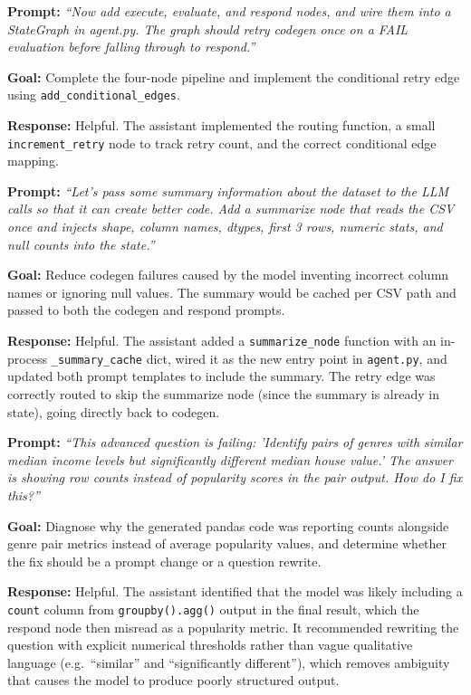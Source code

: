 \documentclass[12pt, oneside]{report}
\begin{document}

\textbf{Prompt:} \textit{``Now add execute, evaluate, and respond nodes, and wire them into a StateGraph in agent.py. The graph should retry codegen once on a FAIL evaluation before falling through to respond.''}

\textbf{Goal:} Complete the four-node pipeline and implement the conditional retry edge using \texttt{add\_conditional\_edges}.

\textbf{Response:} Helpful. The assistant implemented the routing function, a small \texttt{increment\_retry} node to track retry count, and the correct conditional edge mapping.


\textbf{Prompt:} \textit{``Let's pass some summary information about the dataset to the LLM calls so that it can create better code. Add a summarize node that reads the CSV once and injects shape, column names, dtypes, first 3 rows, numeric stats, and null counts into the state.''}

\textbf{Goal:} Reduce codegen failures caused by the model inventing incorrect column names or ignoring null values. The summary would be cached per CSV path and passed to both the codegen and respond prompts.

\textbf{Response:} Helpful. The assistant added a \texttt{summarize\_node} function with an in-process \texttt{\_summary\_cache} dict, wired it as the new entry point in \texttt{agent.py}, and updated both prompt templates to include the summary. The retry edge was correctly routed to skip the summarize node (since the summary is already in state), going directly back to codegen.


\textbf{Prompt:} \textit{``This advanced question is failing: 'Identify pairs of genres with similar median income levels but significantly different median house value.' The answer is showing row counts instead of popularity scores in the pair output. How do I fix this?''}

\textbf{Goal:} Diagnose why the generated pandas code was reporting counts alongside genre pair metrics instead of average popularity values, and determine whether the fix should be a prompt change or a question rewrite.

\textbf{Response:} Helpful. The assistant identified that the model was likely including a \texttt{count} column from \texttt{groupby().agg()} output in the final result, which the respond node then misread as a popularity metric. It recommended rewriting the question with explicit numerical thresholds rather than vague qualitative language (e.g.\ ``similar'' and ``significantly different''), which removes ambiguity that causes the model to produce poorly structured output.
\end{document}
